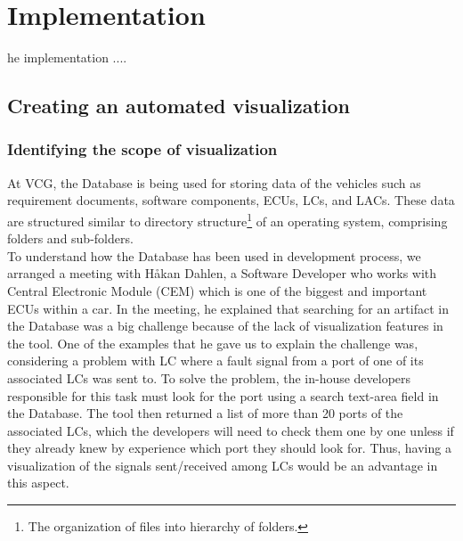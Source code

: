 \chapter{Implementation}
\label{implementation}

\lettrine[findent=2pt]{}{ }he implementation ....

\section{Creating an automated visualization}
\subsection{Identifying the scope of visualization}
\label{IM:identifying_scope_visualization}
At VCG, the Database is being used for storing data of the vehicles such as requirement documents, software components, ECUs, LCs, and LACs. These data are structured similar to directory structure\footnote{The organization of files into hierarchy of folders.} of an operating system, comprising folders and sub-folders.\\

To understand how the Database has been used in development process, we arranged a meeting with Håkan Dahlen, a Software Developer who works with Central Electronic Module (CEM) which is one of the biggest and important ECUs within a car. In the meeting, he explained that searching for an artifact in the Database was a big challenge because of the lack of visualization features in the tool. One of the examples that he gave us to explain the challenge was, considering a problem with LC where a fault signal from a port of one of its associated LCs was sent to. To solve the problem, the in-house developers responsible for this task must look for the port using a search text-area field in the Database. The tool then returned a list of more than 20 ports of the associated LCs, which the developers will need to check them one by one unless if they already knew by experience which port they should look for. Thus, having a visualization of the signals sent/received among LCs would be an advantage in this aspect.\\

